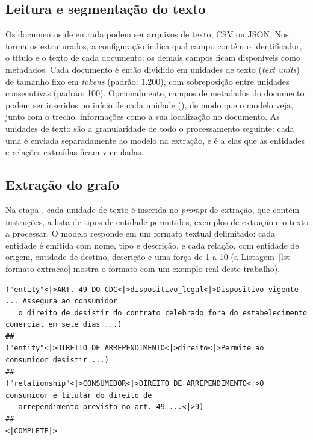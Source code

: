 \subsection{Leitura e segmentação do texto}
\label{sec-graphrag-indexacao-segmentacao}

Os documentos de entrada podem ser arquivos de texto, CSV ou JSON. Nos formatos estruturados, a configuração indica qual campo contém o identificador, o título e o texto de cada documento; os demais campos ficam disponíveis como metadados. Cada documento é então dividido em unidades de texto (\textit{text units}) de tamanho fixo em \textit{tokens} (padrão: 1.200), com sobreposição entre unidades consecutivas (padrão: 100). Opcionalmente, campos de metadados do documento podem ser inseridos no início de cada unidade (), de modo que o modelo veja, junto com o trecho, informações como a sua localização no documento. As unidades de texto são a granularidade de todo o processamento seguinte: cada uma é enviada separadamente ao modelo na extração, e é a elas que as entidades e relações extraídas ficam vinculadas.

\subsection{Extração do grafo}
\label{sec-graphrag-indexacao-extracao}

Na etapa , cada unidade de texto é inserida no \textit{prompt} de extração, que contém instruções, a lista de tipos de entidade permitidos, exemplos de extração e o texto a processar. O modelo responde em um formato textual delimitado: cada entidade é emitida com nome, tipo e descrição, e cada relação, com entidade de origem, entidade de destino, descrição e uma força de 1 a 10 (a Listagem~\ref{lst-formato-extracao} mostra o formato com um exemplo real deste trabalho).

\begin{lstlisting}[caption={Formato de saída da extração de entidades e relações (exemplo simplificado).}, label=lst-formato-extracao]
("entity"<|>ART. 49 DO CDC<|>dispositivo_legal<|>Dispositivo vigente ... Assegura ao consumidor
   o direito de desistir do contrato celebrado fora do estabelecimento comercial em sete dias ...)
##
("entity"<|>DIREITO DE ARREPENDIMENTO<|>direito<|>Permite ao consumidor desistir ...)
##
("relationship"<|>CONSUMIDOR<|>DIREITO DE ARREPENDIMENTO<|>O consumidor é titular do direito de
   arrependimento previsto no art. 49 ...<|>9)
##
<|COMPLETE|>
\end{lstlisting}

